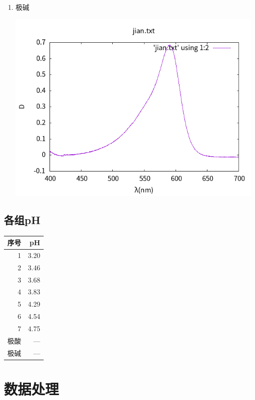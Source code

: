 \documentclass[11pt]{report}
\begin{document}
\begin{enumerate}
\begin{center}
\end{center}
\item 极碱
\label{sec:org5ddcaae}
\begin{center}
\includegraphics[width=.9\linewidth]{../img/jian.txt.png}
\end{center}
\end{enumerate}
\section{各组pH}
\label{sec:orgb0f8694}
\begin{center}
\begin{tabular}{rr}
序号 & pH\\
\hline
1 & 3.20\\
2 & 3.46\\
3 & 3.68\\
4 & 3.83\\
5 & 4.29\\
6 & 4.54\\
7 & 4.75\\
极酸 & ---\\
极碱 & ---\\
\end{tabular}
\end{center}
\chapter{数据处理}
\label{sec:org6990db6}
\end{document}
